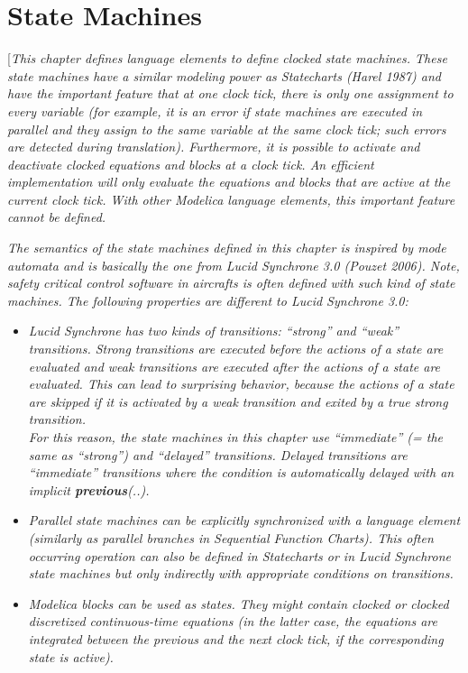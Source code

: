 \chapter{State Machines}

{[}\emph{This chapter defines language elements to define clocked state
machines. These state machines have a similar modeling power as
Statecharts (Harel 1987) and have the important feature that at one
clock tick, there is only one assignment to every variable (for example,
it is an error if state machines are executed in parallel and they
assign to the same variable at the same clock tick; such errors are
detected during translation). Furthermore, it is possible to activate
and deactivate clocked equations and blocks at a clock tick. An
efficient implementation will only evaluate the equations and blocks
that are active at the current clock tick. With other Modelica language
elements, this important feature cannot be defined.}

\emph{The semantics of the state machines defined in this chapter is
inspired by mode automata and is basically the one from Lucid Synchrone
3.0 (Pouzet 2006). Note, safety critical control software in aircrafts
is often defined with such kind of state machines. The following
properties are different to Lucid Synchrone 3.0:}

\begin{itemize}
\item
  \emph{Lucid Synchrone has two kinds of transitions: ``strong'' and
  ``weak'' transitions. Strong transitions are executed before the
  actions of a state are evaluated and weak transitions are executed
  after the actions of a state are evaluated. This can lead to
  surprising behavior, because the actions of a state are skipped if it
  is activated by a weak transition and exited by a true strong
  transition.\\
  For this reason, the state machines in this chapter use ``immediate''
  (= the same as ``strong'') and ``delayed'' transitions. Delayed
  transitions are ``immediate'' transitions where the condition is
  automatically delayed with an implicit \textbf{previous}(..). }
\item
  \emph{Parallel state machines can be explicitly synchronized with a
  language element (similarly as parallel branches in Sequential
  Function Charts). This often occurring operation can also be defined
  in Statecharts or in Lucid Synchrone state machines but only
  indirectly with appropriate conditions on transitions.}
\item
  \emph{Modelica blocks can be used as states. They might contain
  clocked or clocked discretized continuous-time equations (in the
  latter case, the equations are integrated between the previous and the
  next clock tick, if the corresponding state is active).}
\end{itemize}

